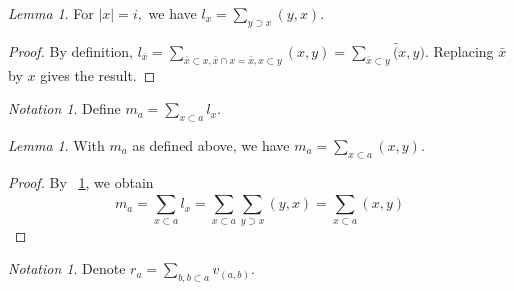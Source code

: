 \documentclass[10 pt]{amsart}
\theoremstyle{plain}
\theoremstyle{definition}
\theoremstyle{remark}
\numberwithin{equation}{section}
\newtheorem{lem}[thm]{Lemma}
\theoremstyle{remark}
\newtheorem{note}[thm]{Notation}
\begin{document}
\begin{lem}
\label{l_diag_equivalence}
For $|x| = i,$ we have $l_{x} = \sum_{y \supset x}^{}(y, x).$
\end{lem}
\begin{proof}
By definition, $l_{\bar x} = \sum_{\bar x\subset x,\bar x \cap x = \bar x,x\subset y}^{}(x, y) = \sum_{\bar x\subset y}^{}\bar (x, y).$ Replacing $\bar x$ by $x$ gives the result.
\end{proof}

\begin{note}
Define $m_a = \sum_{x \subset a}^{}l_{x}.$
\end{note}

\begin{lem}
\label{m_equivalence}
With $m_a$ as defined above, we have $m_a = \sum_{x\subset a}^{}(x, y).$
\end{lem}
\begin{proof}
By ~\ref{l_diag_equivalence}, we obtain
$$m_a = \sum_{x \subset a}^{}l_{x} = \sum_{x \subset a}^{}\sum_{y \supset x}^{}(y, x)= \sum_{x\subset a}^{}(x, y)$$
\end{proof}

\begin{note}
Denote $r_a = \sum_{b,b\subset a}^{} v_{(a, b)}.$
\end{note}
\end{document}
